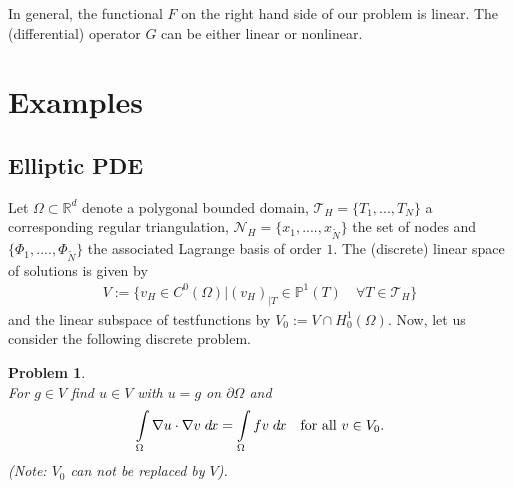 \documentclass[a4paper,11pt]{article}
\numberwithin{equation}{section}
\newtheorem{problem}[definition]{Problem}
\newcommand{\theoremNewline}{\hspace{1mm}\\}
\newcommand{\hnS}{\hspace{-1.25pt}}
\newcommand{\dx}{\;d\hnS x}
\begin{document}
    In general, the functional $F$ on the right hand side of our problem is linear. The (differential) operator $G$
    can be either linear or nonlinear.

  \section{Examples}
    \label{section::examples}

    \subsection{Elliptic PDE}

      Let $\Omega \subset \mathbb{R}^d$ denote a polygonal bounded domain, $\mathcal{T}_H = \{ T_1, ..., T_N \}$ a
      corresponding regular triangulation, $\mathcal{N}_H = \{ x_1, ...., x_{\tilde{N}}\}$ the set of nodes and
      $\{ \Phi_1, ...., \Phi_{\tilde{N}}\}$ the associated Lagrange basis of order $1$. The (discrete) linear space of
      solutions is given by
      \begin{align*}
        V :=
          \Big\{
            v_H \in C^0(\Omega)
          \Big|
            (v_H)_{|T}\in \mathbb{P}^1(T) \quad\forall T \in \mathcal{T}_H
          \Big\}
      \end{align*}
      and the linear subspace of testfunctions by $V_0 := V \cap H^1_0(\Omega)$. Now, let us consider the
      following discrete problem.

      \begin{problem}\theoremNewline
      For $g \in V$ find $u \in V$ with $u=g$ on $\partial \Omega$ and
      \begin{align*}
      \int\limits_{\Omega} \nabla u \cdot \nabla v \dx = \int\limits_{\Omega} f v \dx &&\text{for all }v \in V_0.
      \end{align*}
      (Note: $V_0$ can not be replaced by $V$).
      \end{problem}
\end{document}
